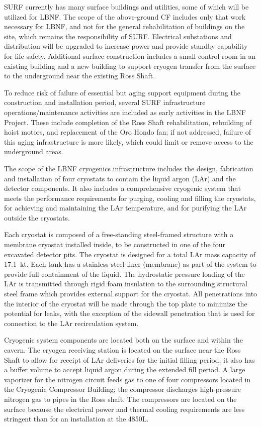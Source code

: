 SURF currently has many surface buildings and utilities, some of which will be utilized for LBNF. The scope of the above-ground CF includes only that work necessary for LBNF, and not for the general rehabilitation of buildings on the site, which remains the responsibility of SURF. 
Electrical substations and distribution will be upgraded to increase power and provide standby capability for life safety. Additional surface construction %
includes a small control room in an existing building and a new building to support cryogen transfer from the surface to the underground near the existing Ross Shaft.
 
To reduce risk of failure of essential but aging support equipment during the construction and installation period, several SURF infrastructure operations/maintenance activities are included as early activities in  the LBNF Project. These include completion of the Ross Shaft rehabilitation, rebuilding of hoist motors, and replacement of the Oro Hondo fan; if not addressed, %
failure of this aging infrastructure is more likely, which could limit or remove access to the underground areas.
 
The scope of the LBNF cryogenics infrastructure includes the design, fabrication and installation of four cryostats to contain the liquid argon (LAr) and the detector components. It also includes a comprehensive cryogenic system that meets the performance requirements for purging, cooling and filling the cryostats, for achieving and maintaining the LAr temperature, and for purifying the LAr outside the cryostats. 
 
Each cryostat is composed of a free-standing steel-framed structure with a membrane cryostat %
installed inside, to be constructed in one of the four excavated detector pits. The cryostat is designed for a total LAr mass capacity of 
17.1~kt. Each tank has a stainless-steel liner (membrane) as part of the %
system to provide full containment of the liquid. The hydrostatic pressure loading of the LAr is transmitted through rigid foam insulation to the surrounding structural steel frame which provides external support for the cryostat. All penetrations into the interior of the cryostat will be made through the top plate to minimize the potential for leaks, with the exception of the sidewall penetration that is used for connection to the LAr recirculation system.
 
Cryogenic system components are located both on the surface and within the cavern. The cryogen receiving station is located on the surface near the Ross Shaft to allow for receipt of LAr deliveries for the initial filling period; it also has a buffer volume to accept liquid argon during the extended fill period. A large vaporizer for the nitrogen circuit feeds gas to one of four compressors located in the Cryogenic Compressor Building; the compressor discharges high-pressure nitrogen gas to pipes in the Ross shaft. The compressors are located on the surface because the electrical power  and thermal cooling requirements are less stringent than for an installation at the 4850L.  
 
